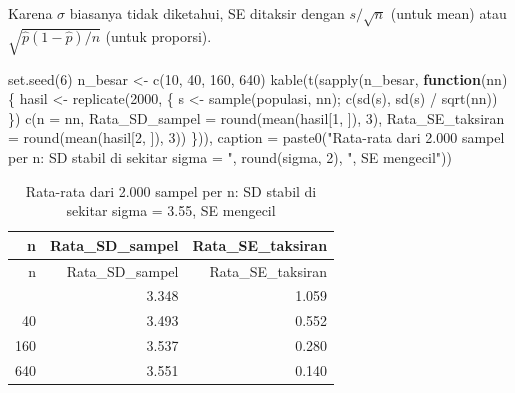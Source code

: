 \documentclass[
  indonesian,
  letterpaper,
]{book}
\newenvironment{Shaded}{\begin{snugshade}}{\end{snugshade}}
\newcommand{\AttributeTok}[1]{\textcolor[rgb]{0.40,0.45,0.13}{#1}}
\newcommand{\ControlFlowTok}[1]{\textcolor[rgb]{0.00,0.23,0.31}{\textbf{#1}}}
\newcommand{\DecValTok}[1]{\textcolor[rgb]{0.68,0.00,0.00}{#1}}
\newcommand{\FunctionTok}[1]{\textcolor[rgb]{0.28,0.35,0.67}{#1}}
\newcommand{\NormalTok}[1]{\textcolor[rgb]{0.00,0.23,0.31}{#1}}
\newcommand{\OtherTok}[1]{\textcolor[rgb]{0.00,0.23,0.31}{#1}}
\newcommand{\SpecialCharTok}[1]{\textcolor[rgb]{0.37,0.37,0.37}{#1}}
\newcommand{\StringTok}[1]{\textcolor[rgb]{0.13,0.47,0.30}{#1}}
\begin{document}
Karena \(\sigma\) biasanya tidak diketahui, SE ditaksir dengan
\(s/\sqrt{n}\) (untuk mean) atau \(\sqrt{\hat{p}(1-\hat{p})/n}\) (untuk
proporsi).

\begin{Shaded}
\begin{Highlighting}[]
\FunctionTok{set.seed}\NormalTok{(}\DecValTok{6}\NormalTok{)}
\NormalTok{n\_besar }\OtherTok{\textless{}{-}} \FunctionTok{c}\NormalTok{(}\DecValTok{10}\NormalTok{, }\DecValTok{40}\NormalTok{, }\DecValTok{160}\NormalTok{, }\DecValTok{640}\NormalTok{)}
\FunctionTok{kable}\NormalTok{(}\FunctionTok{t}\NormalTok{(}\FunctionTok{sapply}\NormalTok{(n\_besar, }\ControlFlowTok{function}\NormalTok{(nn) \{}
\NormalTok{  hasil }\OtherTok{\textless{}{-}} \FunctionTok{replicate}\NormalTok{(}\DecValTok{2000}\NormalTok{, \{ s }\OtherTok{\textless{}{-}} \FunctionTok{sample}\NormalTok{(populasi, nn); }\FunctionTok{c}\NormalTok{(}\FunctionTok{sd}\NormalTok{(s), }\FunctionTok{sd}\NormalTok{(s) }\SpecialCharTok{/} \FunctionTok{sqrt}\NormalTok{(nn)) \})}
  \FunctionTok{c}\NormalTok{(}\AttributeTok{n =}\NormalTok{ nn, }\AttributeTok{Rata\_SD\_sampel =} \FunctionTok{round}\NormalTok{(}\FunctionTok{mean}\NormalTok{(hasil[}\DecValTok{1}\NormalTok{, ]), }\DecValTok{3}\NormalTok{),}
    \AttributeTok{Rata\_SE\_taksiran =} \FunctionTok{round}\NormalTok{(}\FunctionTok{mean}\NormalTok{(hasil[}\DecValTok{2}\NormalTok{, ]), }\DecValTok{3}\NormalTok{))}
\NormalTok{\})), }\AttributeTok{caption =} \FunctionTok{paste0}\NormalTok{(}\StringTok{"Rata{-}rata dari 2.000 sampel per n: SD stabil di sekitar sigma = "}\NormalTok{,}
                      \FunctionTok{round}\NormalTok{(sigma, }\DecValTok{2}\NormalTok{), }\StringTok{", SE mengecil"}\NormalTok{))}
\end{Highlighting}
\end{Shaded}

\begin{longtable}[]{@{}rrr@{}}
\caption{Rata-rata dari 2.000 sampel per n: SD stabil di sekitar sigma =
3.55, SE mengecil}\tabularnewline
\toprule\noalign{}
n & Rata\_SD\_sampel & Rata\_SE\_taksiran \\
\midrule\noalign{}
\endfirsthead
\toprule\noalign{}
n & Rata\_SD\_sampel & Rata\_SE\_taksiran \\
\midrule\noalign{}
\endhead
\bottomrule\noalign{}
\endlastfoot
10 & 3.348 & 1.059 \\
40 & 3.493 & 0.552 \\
160 & 3.537 & 0.280 \\
640 & 3.551 & 0.140 \\
\end{longtable}
\end{document}
